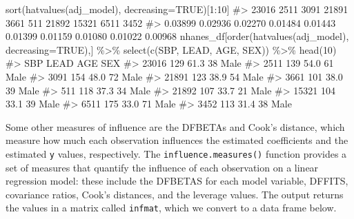 \documentclass[
  letterpaper,
]{krantz}
\makeatletter
\newenvironment{Shaded}{\begin{snugshade}}{\end{snugshade}}
\newcommand{\AttributeTok}[1]{\textcolor[rgb]{0.40,0.45,0.13}{#1}}
\newcommand{\CommentTok}[1]{\textcolor[rgb]{0.37,0.37,0.37}{#1}}
\newcommand{\ConstantTok}[1]{\textcolor[rgb]{0.56,0.35,0.01}{#1}}
\newcommand{\DecValTok}[1]{\textcolor[rgb]{0.68,0.00,0.00}{#1}}
\newcommand{\FunctionTok}[1]{\textcolor[rgb]{0.28,0.35,0.67}{#1}}
\newcommand{\NormalTok}[1]{\textcolor[rgb]{0.00,0.23,0.31}{#1}}
\newcommand{\SpecialCharTok}[1]{\textcolor[rgb]{0.37,0.37,0.37}{#1}}
\newenvironment{kframe}{%
\medskip{}
\setlength{\fboxsep}{.8em}
 \def\at@end@of@kframe{}%
 \ifinner\ifhmode%
  \def\at@end@of@kframe{\end{minipage}}%
  \begin{minipage}{\columnwidth}%
 \fi\fi%
 \def\FrameCommand##1{\hskip\@totalleftmargin \hskip-\fboxsep
 \colorbox{shadecolor}{##1}\hskip-\fboxsep
     \hskip-\linewidth \hskip-\@totalleftmargin \hskip\columnwidth}%
 \MakeFramed {\advance\hsize-\width
   \@totalleftmargin\z@ \linewidth\hsize
   \@setminipage}}%
 {\par\unskip\endMakeFramed%
 \at@end@of@kframe}
\renewenvironment{Shaded}{\begin{kframe}}{\end{kframe}}
\makeatother
\begin{document}
\begin{Shaded}
\begin{Highlighting}[]
\FunctionTok{sort}\NormalTok{(}\FunctionTok{hatvalues}\NormalTok{(adj\_model), }\AttributeTok{decreasing=}\ConstantTok{TRUE}\NormalTok{)[}\DecValTok{1}\SpecialCharTok{:}\DecValTok{10}\NormalTok{]}
\CommentTok{\#\textgreater{}   23016    2511    3091   21891    3661     511   21892   15321    6511    3452 }
\CommentTok{\#\textgreater{} 0.03899 0.02936 0.02270 0.01484 0.01443 0.01399 0.01159 0.01080 0.01022 0.00968}
\NormalTok{nhanes\_df[}\FunctionTok{order}\NormalTok{(}\FunctionTok{hatvalues}\NormalTok{(adj\_model), }\AttributeTok{decreasing=}\ConstantTok{TRUE}\NormalTok{),] }\SpecialCharTok{\%\textgreater{}\%} 
  \FunctionTok{select}\NormalTok{(}\FunctionTok{c}\NormalTok{(SBP, LEAD, AGE, SEX)) }\SpecialCharTok{\%\textgreater{}\%} \FunctionTok{head}\NormalTok{(}\DecValTok{10}\NormalTok{)}
\CommentTok{\#\textgreater{}       SBP LEAD AGE  SEX}
\CommentTok{\#\textgreater{} 23016 129 61.3  38 Male}
\CommentTok{\#\textgreater{} 2511  139 54.0  61 Male}
\CommentTok{\#\textgreater{} 3091  154 48.0  72 Male}
\CommentTok{\#\textgreater{} 21891 123 38.9  54 Male}
\CommentTok{\#\textgreater{} 3661  101 38.0  39 Male}
\CommentTok{\#\textgreater{} 511   118 37.3  34 Male}
\CommentTok{\#\textgreater{} 21892 107 33.7  21 Male}
\CommentTok{\#\textgreater{} 15321 104 33.1  39 Male}
\CommentTok{\#\textgreater{} 6511  175 33.0  71 Male}
\CommentTok{\#\textgreater{} 3452  113 31.4  38 Male}
\end{Highlighting}
\end{Shaded}

Some other measures of influence are the DFBETAs and Cook's distance,
which measure how much each observation influences the estimated
coefficients and the estimated \texttt{y} values, respectively. The
\texttt{influence.measures()} function provides a set of measures that
quantify the influence of each observation on a linear regression model:
these include the DFBETAS for each model variable, DFFITS, covariance
ratios, Cook's distances, and the leverage values. The output returns
the values in a matrix called \texttt{infmat}, which we convert to a
data frame below.
\end{document}
